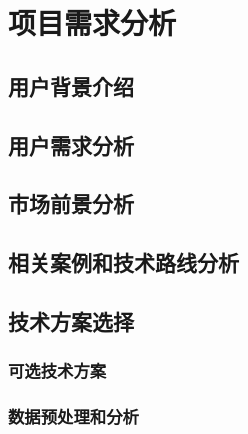 
\chapter{项目需求分析} %

\label{Chapter2} 
\section{用户背景介绍}
\section{用户需求分析}
\section{市场前景分析}
\section{相关案例和技术路线分析}
\section{技术方案选择}
\subsection{可选技术方案}
\subsection{数据预处理和分析}